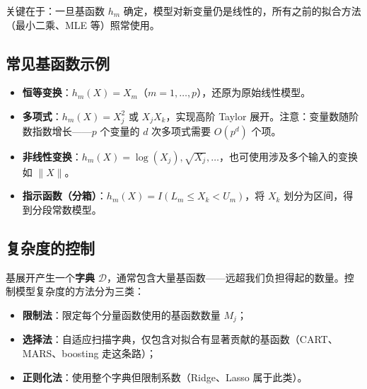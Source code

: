 关键在于：一旦基函数 $h_m$ 确定，模型对新变量仍是线性的，所有之前的拟合方法（最小二乘、MLE 等）照常使用。

\subsection{常见基函数示例}

\begin{itemize}
    \item \textbf{恒等变换}：$h_m(X) = X_m$（$m=1,\ldots,p$），还原为原始线性模型。
    \item \textbf{多项式}：$h_m(X) = X_j^2$ 或 $X_j X_k$，实现高阶 Taylor 展开。注意：变量数随阶数指数增长——$p$ 个变量的 $d$ 次多项式需要 $O(p^d)$ 个项。
    \item \textbf{非线性变换}：$h_m(X) = \log(X_j), \sqrt{X_j}, \ldots$，也可使用涉及多个输入的变换如 $\|X\|$。
    \item \textbf{指示函数（分箱）}：$h_m(X) = I(L_m \le X_k < U_m)$，将 $X_k$ 划分为区间，得到分段常数模型。
\end{itemize}

\subsection{复杂度的控制}

基展开产生一个\textbf{字典} $\mathcal{D}$，通常包含大量基函数——远超我们负担得起的数量。控制模型复杂度的方法分为三类：
\begin{itemize}
    \item \textbf{限制法}：限定每个分量函数使用的基函数数量 $M_j$；
    \item \textbf{选择法}：自适应扫描字典，仅包含对拟合有显著贡献的基函数（CART、MARS、boosting 走这条路）；
    \item \textbf{正则化法}：使用整个字典但限制系数（Ridge、Lasso 属于此类）。
\end{itemize}

